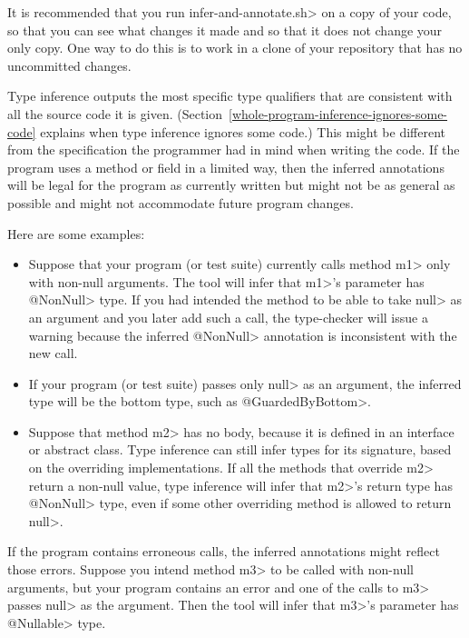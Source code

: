 It is recommended that you run \<infer-and-annotate.sh> on a copy of your
code, so that you can see what changes it made and so that it does not
change your only copy.  One way to do this is to work in a clone of your
repository that has no uncommitted changes.



Type inference outputs the most specific type qualifiers that are
consistent with all the source code it is given.
(Section~\ref{whole-program-inference-ignores-some-code}
explains when type inference ignores some code.)
This might be different from the specification the programmer had in mind
when writing the code.
If the program uses a method or field in a limited way, then the inferred
annotations will be legal for the program as
currently written but might not be as general as possible and might not
accommodate future program changes.

Here are some examples:

\begin{itemize}
\item
Suppose that your program (or test suite) currently calls
method \<m1> only with non-null
arguments.  The tool will infer that \<m1>'s parameter has
\<@NonNull> type.  If you had intended the method to be able to
take \<null> as an argument and you later add such a call, the type-checker
will issue a warning because the inferred \<@NonNull>
annotation is inconsistent with the new call.

\item
If your program (or test suite) passes only \<null> as an argument, the
inferred type will be the bottom type, such as \<@GuardedByBottom>.

\item
Suppose that method \<m2> has no body, because it is defined in an interface or
abstract class.
Type inference can still infer types for its signature, based on the
overriding implementations.
If all the methods that override \<m2> return a non-null value, type
inference will infer that \<m2>'s return type has \<@NonNull> type, even if
some other overriding method is allowed to return
\<null>.

\end{itemize}

If the program contains erroneous calls, the
inferred annotations might reflect those errors.
Suppose you intend method \<m3> to be called with
non-null arguments, but your program contains an error and one of the calls
to \<m3> passes \<null> as the argument.  Then the tool will infer that
\<m3>'s parameter has \<@Nullable> type.

